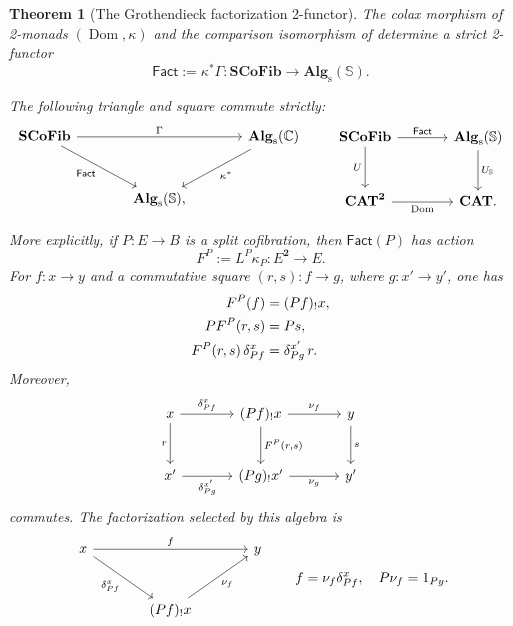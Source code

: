 \documentclass[11pt]{article}
\theoremstyle{plain}
\newtheorem{theorem}{Theorem}[section]
\theoremstyle{definition}
\theoremstyle{remark}
\newcommand{\CAT}{\mathbf{CAT}}
\newcommand{\SCoFib}{\mathbf{SCoFib}}
\newcommand{\Alg}{\mathbf{Alg}_{\mathrm{s}}}
\newcommand{\Dom}{\operatorname{Dom}}
\newcommand{\C}{\mathbb{C}}
\newcommand{\Sq}{\mathbb{S}}
\newcommand{\Fact}{\mathsf{Fact}}
\numberwithin{equation}{section}
\begin{document}
\begin{theorem}[The Grothendieck factorization 2-functor]
\label{thm:grothendieck-factorization-functor}
The colax morphism of 2-monads $(\Dom,\kappa)$ and the comparison
isomorphism of  determine a strict 2-functor
\begin{equation}
  \Fact:=\kappa^{*}\Gamma\colon
  \SCoFib\longrightarrow\Alg(\Sq).
  \label{eq:Fact-definition}
\end{equation}
\begin{samepage}
The following triangle and square commute strictly:
\begin{equation*}
\begin{tikzcd}[column sep=large,row sep=large]
\SCoFib \arrow[rr,"\Gamma"] \arrow[dr,"\Fact"']
  && \Alg(\C) \arrow[dl,"\kappa^{*}"] \\
  & \Alg(\Sq), &
\end{tikzcd}
\qquad
\begin{tikzcd}[column sep=large,row sep=large]
\SCoFib \arrow[r,"\Fact"] \arrow[d,"U"']
  & \Alg(\Sq) \arrow[d,"U_{\Sq}"] \\
\CAT^{\mathbf 2} \arrow[r,"\Dom"'] & \CAT .
\end{tikzcd}
\end{equation*}
\end{samepage}
More explicitly, if $P\colon E\to B$ is a split cofibration, then
$\Fact(P)$ has action
\begin{equation}
  F^{P}:=L^{P}\kappa_P\colon E^{\mathbf 2}\longrightarrow E.
  \label{eq:Fact-action}
\end{equation}
For $f\colon x\to y$ and a commutative square
$(r,s)\colon f\to g$, where $g\colon x'\to y'$, one has
\begin{align}
  F^{P}(f)&=(Pf)_{!}x,
  \label{eq:FP-object}\\
  P F^{P}(r,s)&=Ps,
  \notag\\
  F^{P}(r,s)\,\delta^{x}_{Pf}&=\delta^{x'}_{Pg}\,r.
  \label{eq:Fact-on-squares}
\end{align}
Moreover,
\begin{equation}
\begin{tikzcd}[column sep=large,row sep=large]
x \arrow[r,"{\delta^{x}_{Pf}}"] \arrow[d,"r"']
  & (Pf)_{!}x \arrow[r,"\nu_f"]
      \arrow[d,"{F^{P}(r,s)}"]
  & y \arrow[d,"s"] \\
x' \arrow[r,"{\delta^{x'}_{Pg}}"']
  & (Pg)_{!}x' \arrow[r,"\nu_g"']
  & y'
\end{tikzcd}
\label{eq:Fact-square-of-factorizations}
\end{equation}
commutes.  The factorization selected by this algebra is
\begin{equation}
\begin{tikzcd}[column sep=large,row sep=large]
x \arrow[rr,"f"] \arrow[dr,"{\delta^{x}_{Pf}}"']
  && y \\
  & (Pf)_{!}x \arrow[ur,"\nu_f"']
\end{tikzcd}
\qquad
f=\nu_f\delta^{x}_{Pf},
\quad P\nu_f=1_{Py}.
  \label{eq:FP-factors}
\end{equation}


\end{theorem}
\end{document}
